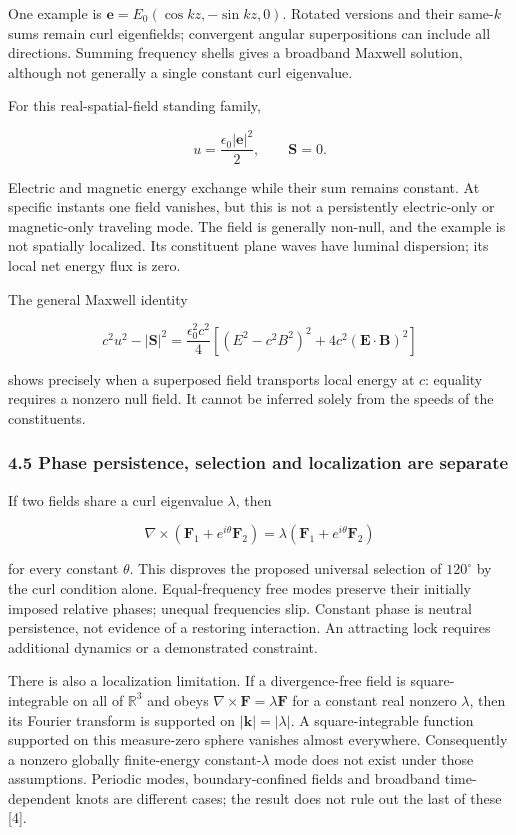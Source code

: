 \documentclass[
  11pt,
]{article}
\begin{document}
One example is \(\mathbf e=E_0(\cos kz,-\sin kz,0)\). Rotated versions
and their same-\(k\) sums remain curl eigenfields; convergent angular
superpositions can include all directions. Summing frequency shells
gives a broadband Maxwell solution, although not generally a single
constant curl eigenvalue.

For this real-spatial-field standing family,

\[
u=\frac{\epsilon_0|\mathbf e|^2}{2},\qquad
\mathbf S=0.
\]

Electric and magnetic energy exchange while their sum remains constant.
At specific instants one field vanishes, but this is not a persistently
electric-only or magnetic-only traveling mode. The field is generally
non-null, and the example is not spatially localized. Its constituent
plane waves have luminal dispersion; its local net energy flux is zero.

The general Maxwell identity

\[
c^2u^2-|\mathbf S|^2=\frac{\epsilon_0^2c^2}{4}
\left[(E^2-c^2B^2)^2+4c^2(\mathbf E\cdot\mathbf B)^2\right]
\]

shows precisely when a superposed field transports local energy at
\(c\): equality requires a nonzero null field. It cannot be inferred
solely from the speeds of the constituents.

\hypertarget{phase-persistence-selection-and-localization-are-separate}{%
\subsubsection{4.5 Phase persistence, selection and localization are
separate}\label{phase-persistence-selection-and-localization-are-separate}}

If two fields share a curl eigenvalue \(\lambda\), then

\[
\nabla\times(\mathbf F_1+e^{i\theta}\mathbf F_2)
=\lambda(\mathbf F_1+e^{i\theta}\mathbf F_2)
\]

for every constant \(\theta\). This disproves the proposed universal
selection of \(120^\circ\) by the curl condition alone. Equal-frequency
free modes preserve their initially imposed relative phases; unequal
frequencies slip. Constant phase is neutral persistence, not evidence of
a restoring interaction. An attracting lock requires additional dynamics
or a demonstrated constraint.

There is also a localization limitation. If a divergence-free field is
square-integrable on all of \(\mathbb R^3\) and obeys
\(\nabla\times\mathbf F=\lambda\mathbf F\) for a constant real nonzero
\(\lambda\), then its Fourier transform is supported on
\(|\mathbf k|=|\lambda|\). A square-integrable function supported on
this measure-zero sphere vanishes almost everywhere. Consequently a
nonzero globally finite-energy constant-\(\lambda\) mode does not exist
under those assumptions. Periodic modes, boundary-confined fields and
broadband time-dependent knots are different cases; the result does not
rule out the last of these {[}4{]}.
\end{document}
